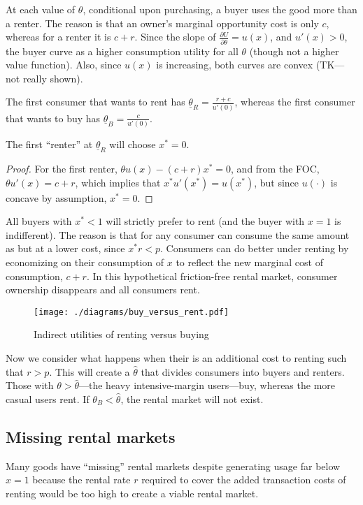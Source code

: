 \documentclass[11pt]{article}
\begin{document}
At each value of $\theta$, conditional upon purchasing, a buyer uses the good more than a renter. 
The reason is that an owner's marginal opportunity cost is only $c$, whereas for a renter it is $c + r$. 
Since the slope of $\frac{\partial U}{\partial \theta} = u(x)$, and $u'(x) > 0$, the buyer curve as a higher consumption utility for all $\theta$ (though not a higher value function). 
Also, since $u(x)$ is increasing, both curves are convex (TK---not really shown). 

The first consumer that wants to rent has $\underline{\theta}_R = \frac{r + c}{u'(0)}$, whereas the first consumer that wants to buy has $\underline{\theta}_B = \frac{c}{u'(0)}$.

\begin{prop}
  The first ``renter'' at $\underline{\theta}_R$  will choose $x^* = 0$. 
\end{prop} 
\begin{proof}
For the first renter, $\theta u(x) - (c + r)x^* = 0$, and from the FOC, $\theta u'(x) = c + r$, which implies 
that $x^* u'(x^*) = u(x^*)$, but since $u(\cdot)$ is concave by assumption, $x^* = 0$.  
\end{proof} 

All buyers with $x^* < 1$ will strictly prefer to rent (and the buyer with $x = 1$ is indifferent). 
The reason is that for any consumer can consume the same amount as but at a lower cost, since $x^*r < p$. 
Consumers can do better under renting by economizing on their consumption of $x$ to reflect the new marginal cost of consumption, $c + r$. 
In this hypothetical friction-free rental market, consumer ownership disappears and all consumers rent. 
  
\begin{figure}
\caption{Indirect utilities of renting versus buying\label{fig:buy_versus_rent}} 
\centering 
\begin{minipage}{0.80 \textwidth} 
\texttt{[image: ./diagrams/buy\_versus\_rent.pdf]}
\end{minipage}  
\end{figure} 

Now we consider what happens when their is an additional cost to renting such that $r > p$.
This will create a $\hat{\theta}$ that divides consumers into buyers and renters. 
Those with $\theta > \hat{\theta}$---the heavy intensive-margin users---buy, whereas the more casual users rent. 
If $\theta_B < \hat{\theta}$, the rental market will not exist. 

\subsection{Missing rental markets}
Many goods have ``missing'' rental markets despite generating usage far below $x = 1$ because the rental rate $r$ required to cover the added transaction costs of renting would be too high to create a viable rental market. 
\end{document}
